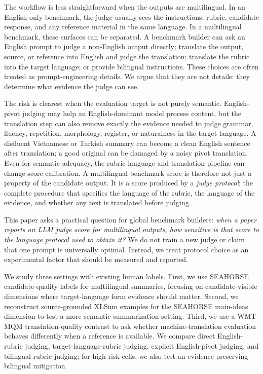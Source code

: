 \documentclass{article}
\begin{document}
The workflow is less straightforward when the outputs are multilingual. In an English-only benchmark, the judge usually sees the instructions, rubric, candidate response, and any reference material in the same language. In a multilingual benchmark, these surfaces can be separated. A benchmark builder can ask an English prompt to judge a non-English output directly; translate the output, source, or reference into English and judge the translation; translate the rubric into the target language; or provide bilingual instructions. These choices are often treated as prompt-engineering details. We argue that they are not details: they determine what evidence the judge can see.

The risk is clearest when the evaluation target is not purely semantic. English-pivot judging may help an English-dominant model process content, but the translation step can also remove exactly the evidence needed to judge grammar, fluency, repetition, morphology, register, or naturalness in the target language. A disfluent Vietnamese or Turkish summary can become a clean English sentence after translation; a good original can be damaged by a noisy pivot translation. Even for semantic adequacy, the rubric language and translation pipeline can change score calibration. A multilingual benchmark score is therefore not just a property of the candidate output. It is a score produced by a \emph{judge protocol}: the complete procedure that specifies the language of the rubric, the language of the evidence, and whether any text is translated before judging.

This paper asks a practical question for global benchmark builders: \emph{when a paper reports an LLM judge score for multilingual outputs, how sensitive is that score to the language protocol used to obtain it?} We do not train a new judge or claim that one prompt is universally optimal. Instead, we treat protocol choice as an experimental factor that should be measured and reported.

We study three settings with existing human labels. First, we use SEAHORSE candidate-quality labels for multilingual summaries, focusing on candidate-visible dimensions where target-language form evidence should matter. Second, we reconstruct source-grounded XLSum examples for the SEAHORSE main-ideas dimension to test a more semantic summarization setting. Third, we use a WMT MQM translation-quality contrast to ask whether machine-translation evaluation behaves differently when a reference is available. We compare direct English-rubric judging, target-language-rubric judging, explicit English-pivot judging, and bilingual-rubric judging; for high-risk cells, we also test an evidence-preserving bilingual mitigation.
\end{document}
